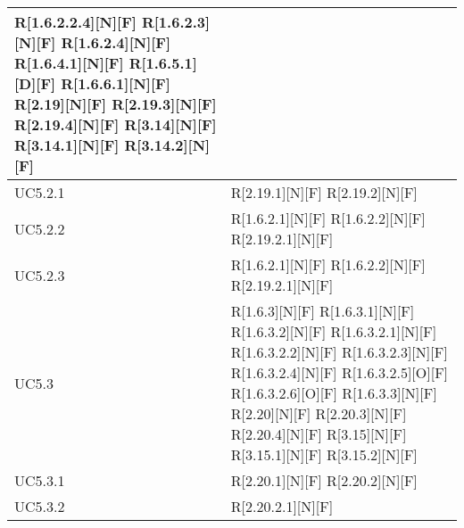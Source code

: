 \begin{longtable}{X | X}
R[1.6.2.2.4][N][F] \newline
R[1.6.2.3][N][F] \newline
R[1.6.2.4][N][F] \newline
R[1.6.4.1][N][F] \newline
R[1.6.5.1][D][F] \newline
R[1.6.6.1][N][F] \newline
R[2.19][N][F] \newline
R[2.19.3][N][F] \newline
R[2.19.4][N][F] \newline
R[3.14][N][F] \newline
R[3.14.1][N][F] \newline
R[3.14.2][N][F]  \\
\hline
UC5.2.1 & R[2.19.1][N][F] \newline
R[2.19.2][N][F]  \\
\hline
UC5.2.2 & R[1.6.2.1][N][F] \newline
R[1.6.2.2][N][F] \newline
R[2.19.2.1][N][F]  \\
\hline
UC5.2.3 & R[1.6.2.1][N][F] \newline
R[1.6.2.2][N][F] \newline
R[2.19.2.1][N][F]  \\
\hline
UC5.3 & R[1.6.3][N][F] \newline
R[1.6.3.1][N][F] \newline
R[1.6.3.2][N][F] \newline
R[1.6.3.2.1][N][F] \newline
R[1.6.3.2.2][N][F] \newline
R[1.6.3.2.3][N][F] \newline
R[1.6.3.2.4][N][F] \newline
R[1.6.3.2.5][O][F] \newline
R[1.6.3.2.6][O][F] \newline
R[1.6.3.3][N][F] \newline
R[2.20][N][F] \newline
R[2.20.3][N][F] \newline
R[2.20.4][N][F] \newline
R[3.15][N][F] \newline
R[3.15.1][N][F] \newline
R[3.15.2][N][F]  \\
\hline
UC5.3.1 & R[2.20.1][N][F] \newline
R[2.20.2][N][F]  \\
\hline
UC5.3.2 & R[2.20.2.1][N][F]  \\

\end{longtable}
